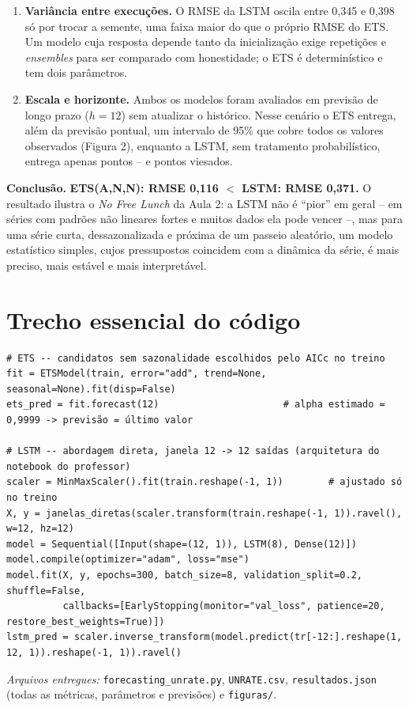 \documentclass[11pt,a4paper]{article}
\begin{document}
\begin{resposta}
\begin{enumerate}[leftmargin=*]
\item \textbf{Variância entre execuções.} O RMSE da LSTM oscila entre 0,345 e 0,398 só por trocar a semente, uma faixa maior do que o próprio RMSE do ETS. Um modelo cuja resposta depende tanto da inicialização exige repetições e \textit{ensembles} para ser comparado com honestidade; o ETS é determinístico e tem dois parâmetros.
\item \textbf{Escala e horizonte.} Ambos os modelos foram avaliados em previsão de longo prazo ($h = 12$) sem atualizar o histórico. Nesse cenário o ETS entrega, além da previsão pontual, um intervalo de 95\% que cobre todos os valores observados (Figura 2), enquanto a LSTM, sem tratamento probabilístico, entrega apenas pontos -- e pontos viesados.
\end{enumerate}
\textbf{Conclusão.} \textbf{ETS(A,N,N): RMSE 0,116 $<$ LSTM: RMSE 0,371.} O resultado ilustra o \textit{No Free Lunch} da Aula 2: a LSTM não é ``pior'' em geral -- em séries com padrões não lineares fortes e muitos dados ela pode vencer --, mas para uma série curta, dessazonalizada e próxima de um passeio aleatório, um modelo estatístico simples, cujos pressupostos coincidem com a dinâmica da série, é mais preciso, mais estável e mais interpretável.
\end{resposta}

\section*{Trecho essencial do código}
\begin{lstlisting}
# ETS -- candidatos sem sazonalidade escolhidos pelo AICc no treino
fit = ETSModel(train, error="add", trend=None, seasonal=None).fit(disp=False)
ets_pred = fit.forecast(12)                      # alpha estimado = 0,9999 -> previsão = último valor

# LSTM -- abordagem direta, janela 12 -> 12 saídas (arquitetura do notebook do professor)
scaler = MinMaxScaler().fit(train.reshape(-1, 1))        # ajustado só no treino
X, y = janelas_diretas(scaler.transform(train.reshape(-1, 1)).ravel(), w=12, hz=12)
model = Sequential([Input(shape=(12, 1)), LSTM(8), Dense(12)])
model.compile(optimizer="adam", loss="mse")
model.fit(X, y, epochs=300, batch_size=8, validation_split=0.2, shuffle=False,
          callbacks=[EarlyStopping(monitor="val_loss", patience=20, restore_best_weights=True)])
lstm_pred = scaler.inverse_transform(model.predict(tr[-12:].reshape(1, 12, 1)).reshape(-1, 1)).ravel()
\end{lstlisting}

\vspace{0.3em}\noindent\small\textit{Arquivos entregues:} \texttt{forecasting\_unrate.py}, \texttt{UNRATE.csv}, \texttt{resultados.json} (todas as métricas, parâmetros e previsões) e \texttt{figuras/}.
\end{document}

